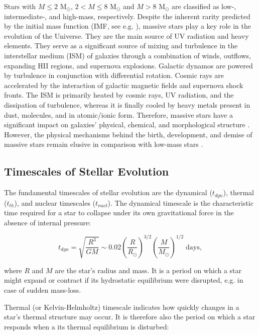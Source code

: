 Stars with $M \leq 2$ M$_{\odot}$, $2 < M \leq 8$ M$_{\odot}$ and $M > 8$ M$_{\odot}$ are classified as low-, intermediate-, and high-mass, respectively. Despite the inherent rarity predicted by the initial mass function (IMF, see e.g. \cite{chabrier2005initial, dib2018emergence}), massive stars play a key role in the evolution of the Universe. They are the main source of UV radiation and heavy elements. They serve as a significant source of mixing and turbulence in the interstellar medium (ISM) of galaxies through a combination of winds, outflows, expanding HII regions, and supernova explosions. Galactic dynamos are powered by turbulence in conjunction with differential rotation. Cosmic rays are accelerated by the interaction of galactic magnetic fields and supernova shock fronts. The ISM is primarily heated by cosmic rays, UV radiation, and the dissipation of turbulence, whereas it is finally cooled by heavy metals present in dust, molecules, and in atomic/ionic form. Therefore, massive stars have a significant impact on galaxies' physical, chemical, and morphological structure \citep{kennicutt2005role}. However, the physical mechanisms behind the birth, development, and demise of massive stars remain elusive in comparison with low-mass stars \citep{zinnecker2007toward}. 


\subsection{Timescales of Stellar Evolution}

The fundamental timescales of stellar evolution are the dynamical ($t_{dyn}$), thermal ($t_{th}$), and nuclear timescales ($t_{nucl}$). The dynamical timescale is the characteristic time required for a star to collapse under its own gravitational force in the absence of internal pressure:

\begin{equation}
    t_{dyn} = \sqrt{\frac{R^3}{GM}} \sim 0.02 \left( \frac{R}{R_{\odot}} \right)^{3/2} \left( \frac{M}{M_{\odot}}\right)^{1/2} \; \text{days},
\end{equation}\label{eq:dynamical_timsecale}

where $R$ and $M$ are the star's radius and mass. It is a period on which a star might expand or contract if its hydrostatic equilibrium were disrupted, e.g. in case of sudden mass-loss.

Thermal (or Kelvin-Helmholtz) timescale indicates how quickly changes in a star's thermal structure may occur. It is therefore also the period on which a star responds when a its thermal equilibrium is disturbed:

